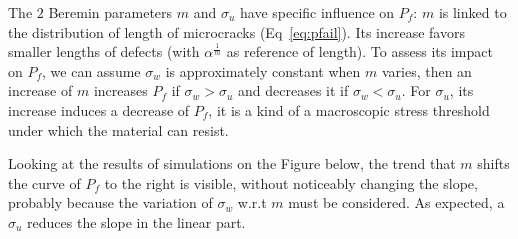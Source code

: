 \documentclass[
10pt, %
a4paper, %
oneside, %
headinclude,footinclude, %
BCOR5mm, %
]{scrartcl}
\begin{document}



The $2$ Beremin parameters $m$ and $\sigma_u$
have specific influence on $P_f$:
$m$ is linked to the distribution of length of microcracks (Eq~\ref{eq:pfail}).
Its increase favors smaller lengths of defects (with $\alpha^\frac{1}{m}$ as reference of length).
To assess its impact on $P_f$, we can
assume $\sigma_w$ is approximately constant when $m$ varies, then
an increase of $m$ increases $P_f$ if $\sigma_w > \sigma_u$ and
decreases it if $\sigma_w < \sigma_u$. For $\sigma_u$, its increase
induces a decrease of $P_f$,
it is a kind of a macroscopic stress threshold under which
the material can resist.


Looking at the results of simulations on the Figure below, the trend that $m$
shifts the curve of $P_f$ to the right is visible, without noticeably changing
the slope, probably because the variation of $\sigma_w$ w.r.t $m$ must
be considered. As expected, a $\sigma_u$ reduces the slope in the
linear part.
\end{document}
